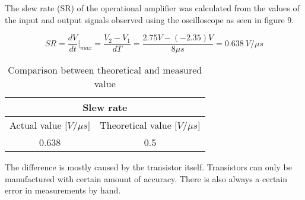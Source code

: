     The slew rate (SR) of the operational amplifier was calculated from the values of the input and output signals observed using the oscilloscope as seen in figure 9.

    $$SR = \dfrac{dV}{dt} \vert _{max} = \frac{V_2-V_1}{dT} = \frac{2.75V-(-2.35) V}{8\mu s} = 0.638 \ V/\mu s$$

    \begin{table}[htbp]
     \centering
       \begin{tabular}{c|c}
        \multicolumn{2}{c}{Slew rate}\\
        \hline
        Actual value [$V/\mu s$] & Theoretical value [$V/\mu s$] \\
       \hline
        0.638          & 0.5 \\
       \end{tabular}%
     \caption{Comparison between theoretical and measured value}
     \label{tab:addlabel}%
   \end{table}%
   
   The difference is mostly caused by the transistor itself. Transistors can only be manufactured with certain amount of accuracy. There is also always a certain error in measurements by hand. 